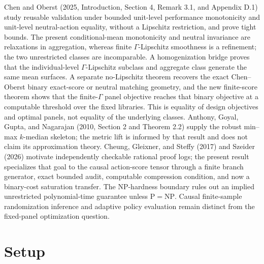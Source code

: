 \documentclass{article}
\begin{document}
Chen and Oberst (2025, Introduction, Section 4, Remark 3.1, and Appendix D.1) study reusable validation under bounded unit-level performance monotonicity and unit-level neutral-action equality, without a Lipschitz restriction, and prove tight bounds. The present conditional-mean monotonicity and neutral invariance are relaxations in aggregation, whereas finite \(\Gamma\)-Lipschitz smoothness is a refinement; the two unrestricted classes are incomparable. A homogenization bridge proves that the individual-level \(\Gamma\)-Lipschitz subclass and aggregate class generate the same mean surfaces. A separate no-Lipschitz theorem recovers the exact Chen--Oberst binary exact-score or neutral matching geometry, and the new finite-score theorem shows that the finite-\(\Gamma\) panel objective reaches that binary objective at a computable threshold over the fixed libraries. This is equality of design objectives and optimal panels, not equality of the underlying classes. Anthony, Goyal, Gupta, and Nagarajan (2010, Section 2 and Theorem 2.2) supply the robust min--max \(k\)-median skeleton; the metric lift is informed by that result and does not claim its approximation theory. Cheung, Gleixner, and Steffy (2017) and Szeider (2026) motivate independently checkable rational proof logs; the present result specializes that goal to the causal action-score tensor through a finite branch generator, exact bounded audit, computable compression condition, and now a binary-cost saturation transfer. The NP-hardness boundary rules out an implied unrestricted polynomial-time guarantee unless \(\mathrm P=\mathrm{NP}\). Causal finite-sample randomization inference and adaptive policy evaluation remain distinct from the fixed-panel optimization question.

\section{Setup}
\end{document}
